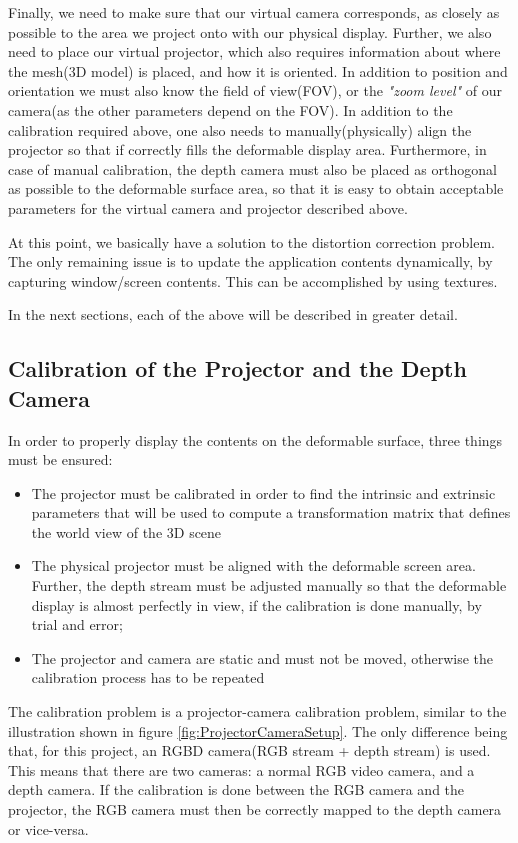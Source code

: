 \documentclass[]{article}
\begin{document}
Finally, we need to make sure that our virtual camera corresponds, as closely as possible to the area we project onto with our physical display. Further, we also need to place our virtual projector, which also requires information about where the mesh(3D model) is placed, and how it is oriented. In addition to position and orientation we must also know the field of view(FOV), or the \textit{"zoom level"} of our camera(as the other parameters depend on the FOV). In addition to the calibration required above, one also needs to manually(physically) align the projector so that if correctly fills the deformable display area. Furthermore, in case of manual calibration, the depth camera must also be placed as orthogonal as possible to the deformable surface area, so that it is easy to obtain acceptable parameters for the virtual camera and projector described above. 

At this point, we basically have a solution to the distortion correction problem. The only remaining issue is to update the application contents dynamically, by capturing window/screen contents. This can be accomplished by using textures.

In the next sections, each of the above will be described in greater detail.

\subsection{Calibration of the Projector and the Depth Camera}

In order to properly display the contents on the deformable surface, three things must be ensured:
\begin{itemize}
\item The projector must be calibrated in order to find the intrinsic and extrinsic parameters that will be used to compute a transformation matrix that defines the world view of the 3D scene
\item The physical projector must be aligned with the deformable screen area. Further, the depth stream must be adjusted manually so that the deformable display is almost perfectly in view, if the calibration is done manually, by trial and error; 
\item The projector and camera are static and must not be moved, otherwise the calibration process has to be repeated\\
\end{itemize}

The calibration problem is a projector-camera calibration problem, similar to the illustration shown in figure \ref{fig:ProjectorCameraSetup}. The only difference being that, for this project, an RGBD camera(RGB stream + depth stream) is used. This means that there are two cameras: a normal RGB video camera, and a depth camera. If the calibration is done between the RGB camera and the projector, the RGB camera must then be correctly mapped to the depth camera or vice-versa.
\end{document}
